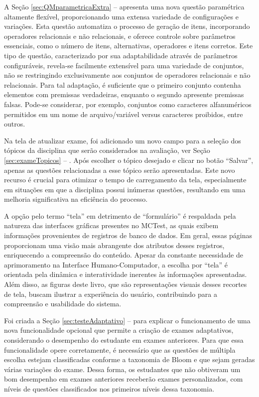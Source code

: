 A Seção \ref{sec:QMparametricaExtra} --  apresenta uma nova questão paramétrica altamente flexível, proporcionando uma extensa variedade de configurações e variações. Esta questão automatiza o processo de geração de itens, incorporando operadores relacionais e não relacionais, e oferece controle sobre parâmetros essenciais, como o número de itens, alternativas, operadores e itens corretos. Este tipo de questão, caracterizado por sua adaptabilidade através de parâmetros configuráveis, revela-se facilmente extensível para uma variedade de conjuntos, não se restringindo exclusivamente aos conjuntos de operadores relacionais e não relacionais. Para tal adaptação, é suficiente que o primeiro conjunto contenha elementos com premissas verdadeiras, enquanto o segundo apresente premissas falsas. Pode-se considerar, por exemplo, conjuntos como caracteres alfanuméricos permitidos em um nome de arquivo/variável versus caracteres proibidos, entre outros.


Na tela de atualizar exame, foi adicionado um novo campo para a seleção dos tópicos da disciplina que serão considerados na avaliação, ver Seção \ref{sec:exameTopicos} -- . Após escolher o tópico desejado e clicar no botão ``Salvar'', apenas as questões relacionadas a esse tópico serão apresentadas. Este novo recurso é crucial para otimizar o tempo de carregamento da tela, especialmente em situações em que a disciplina possui inúmeras questões, resultando em uma melhoria significativa na eficiência do processo.

A opção pelo termo ``tela'' em detrimento de ``formulário'' é respaldada pela natureza das interfaces gráficas presentes no MCTest, as quais exibem informações provenientes de registros de banco de dados. Em geral, essas páginas proporcionam uma visão mais abrangente dos atributos desses registros, enriquecendo a compreensão do conteúdo. Apesar da constante necessidade de aprimoramento na Interface Humano-Computador, a escolha por ``tela'' é orientada pela dinâmica e interatividade inerentes às informações apresentadas. Além disso, as figuras deste livro, que são representações visuais desses recortes de tela, buscam ilustrar a experiência do usuário, contribuindo para a compreensão e usabilidade do sistema.

Foi criada a Seção \ref{sec:testeAdaptativo} --  para explicar o funcionamento de uma nova funcionalidade opcional que permite a criação de exames adaptativos, considerando o desempenho do estudante em exames anteriores. Para que essa funcionalidade opere corretamente, é necessário que as questões de múltipla escolha estejam classificadas conforme a taxonomia de Bloom e que sejam geradas várias variações do exame. Dessa forma, os estudantes que não obtiveram um bom desempenho em exames anteriores receberão exames personalizados, com níveis de questões classificados nos primeiros níveis dessa taxonomia.


